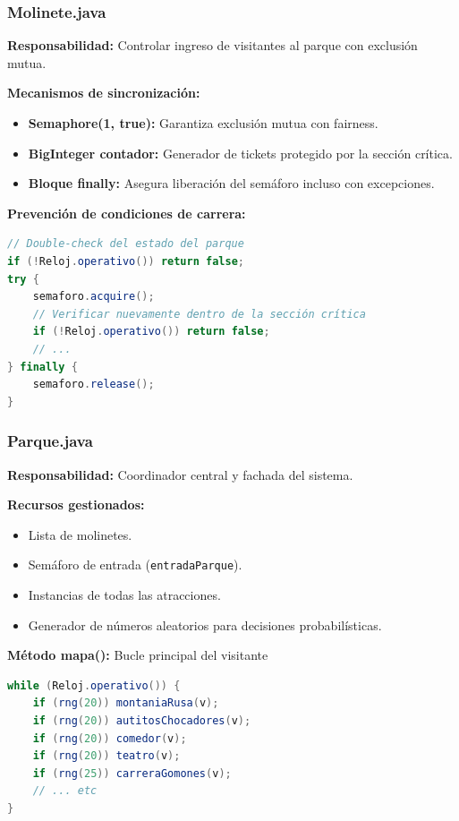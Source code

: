 \documentclass[12pt,a4paper]{article}
\begin{document}
\subsubsection{Molinete.java}

\textbf{Responsabilidad:} Controlar ingreso de visitantes al parque con exclusión mutua.

\textbf{Mecanismos de sincronización:}
\begin{itemize}
    \item \textbf{Semaphore(1, true):} Garantiza exclusión mutua con fairness.
    \item \textbf{BigInteger contador:} Generador de tickets protegido por la sección crítica.
    \item \textbf{Bloque finally:} Asegura liberación del semáforo incluso con excepciones.
\end{itemize}

\textbf{Prevención de condiciones de carrera:}
\begin{lstlisting}[language=Java]
// Double-check del estado del parque
if (!Reloj.operativo()) return false;
try {
    semaforo.acquire();
    // Verificar nuevamente dentro de la sección crítica
    if (!Reloj.operativo()) return false;
    // ...
} finally {
    semaforo.release();
}
\end{lstlisting}

\subsubsection{Parque.java}

\textbf{Responsabilidad:} Coordinador central y fachada del sistema.

\textbf{Recursos gestionados:}
\begin{itemize}
    \item Lista de molinetes.
    \item Semáforo de entrada (\texttt{entradaParque}).
    \item Instancias de todas las atracciones.
    \item Generador de números aleatorios para decisiones probabilísticas.
\end{itemize}

\textbf{Método mapa():} Bucle principal del visitante

\begin{lstlisting}[language=Java]
while (Reloj.operativo()) {
    if (rng(20)) montaniaRusa(v);
    if (rng(20)) autitosChocadores(v);
    if (rng(20)) comedor(v);
    if (rng(20)) teatro(v);
    if (rng(25)) carreraGomones(v);
    // ... etc
}
\end{lstlisting}
\end{document}
